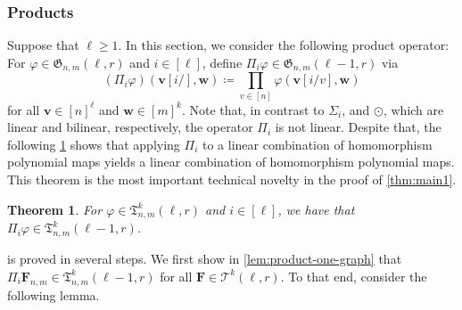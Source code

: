\documentclass[10pt,a4paper]{article}
\theoremstyle{definition}
\theoremstyle{plain}
\newtheorem{theorem}[definition]{Theorem}
\theoremstyle{remark}
\renewcommand{\phi}{\varphi}
\begin{document}
	\subsubsection{Products}
	
	Suppose that $\ell \geq 1$.
	In this section, we consider the following product operator:
	For $\phi \in \mathfrak{G}_{n,m}(\ell, r)$ and $i \in [\ell]$,
	define $\Pi_i \phi \in \mathfrak{G}_{n,m}(\ell-1, r)$ via 
	\[ (\Pi_i \phi)(\boldsymbol{v}[i/], \boldsymbol{w}) \coloneqq \prod_{v \in [n]} \phi(\boldsymbol{v}[i/v], \boldsymbol{w}) \] 
	for all $\boldsymbol{v} \in [n]^\ell$ and $\boldsymbol{w} \in [m]^k$.
	Note that, in contrast to $\Sigma_i$, and $\odot$,
	which are linear and bilinear, respectively,
	the operator $\Pi_i$ is not linear.
	Despite that, the following \cref{thm:product-lincomb} shows that applying $\Pi_i$ to a linear combination of homomorphism polynomial maps yields a linear combination of homomorphism polynomial maps.
	This theorem is the most important technical novelty in the proof of \cref{thm:main1}.
	
	\begin{theorem}\label{thm:product-lincomb}
		For $\phi \in \mathfrak{T}^k_{n,m}(\ell,r )$ and $i \in [\ell]$,
		we have that $\Pi_i\phi \in \mathfrak{T}^k_{n,m}(\ell-1, r)$.
	\end{theorem}
	
	
	 is proved in several steps.
	We first show in \cref{lem:product-one-graph} that $\Pi_i \boldsymbol{F}_{n,m} \in \mathfrak{T}^k_{n,m}(\ell-1, r)$ for all $\boldsymbol{F} \in \mathcal{T}^k(\ell, r)$.
	To that end, consider the following lemma.
	
\end{document}
